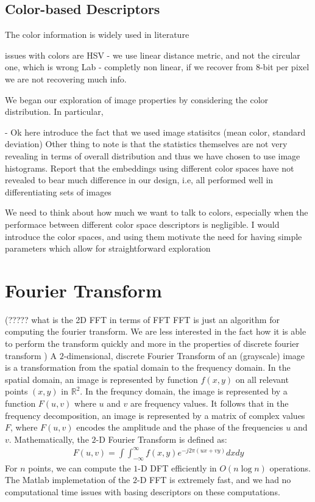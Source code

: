 \documentclass{report}
\begin{document}
\subsection{Color-based Descriptors}
The color information is widely used in literature

issues with colors are 
HSV - we use linear distance metric, and not the circular one, which is wrong
Lab - completly non linear, if we recover from 8-bit per pixel we are not recovering much info.

We began our exploration of image properties by considering the color distribution. In particular, 

{\color{red} - Ok here introduce the fact that we used image statisitcs (mean color, standard deviation) Other thing to note is that the statistics themselves are not very revealing in terms of overall distribution and thus we have chosen to use image histograms. Report that the embeddings using different color spaces have not revealed to bear much difference in our design, i.e, all performed well in differentiating sets of images}

{\color{red} We need to think about how much we want to talk to colors, especially when the performace between different color space descriptors is negligible. I would introduce the color spaces, and using them motivate the need for having simple parameters which allow for straightforward exploration }

\section{Fourier Transform} (????? what is the 2D FFT in terms of FFT {\color{red} FFT is just an algorithm for computing the fourier transform. We are less interested in the fact how it is able to perform the transform quickly and more in the properties of discrete fourier transform })
A $2$-dimensional, discrete Fourier Transform of an (grayscale) image is a transformation from the spatial domain to the frequency domain. In the spatial domain, an image is represented by function $f(x,y)$ on all relevant points $(x,y)$ in  $\mathbb{R}^2$. In the frequncy domain, the image is represented by a function $F(u,v)$ where $u$ and $v$ are frequency values. It follows that in the frequency decomposition, an image is represented by a matrix of complex values $F$, where $F(u,v)$ encodes the amplitude and the phase of the frequencies $u$ and $v$. Mathematically, the $2$-D Fourier Transform is defined as:
\begin{eqnarray}
F(u,v) = \int \int ^{\infty}_{-\infty} f(x,y)e^{-j2\pi (ux+vy)}dx dy
\end{eqnarray}
For $n$ points, we can compute the $1$-D DFT efficiently in $O(n\log{n})$ operations. The Matlab implemetation of the $2$-D FFT is extremely  fast, and we had no computational time issues with basing descriptors on these computations.
\end{document}
